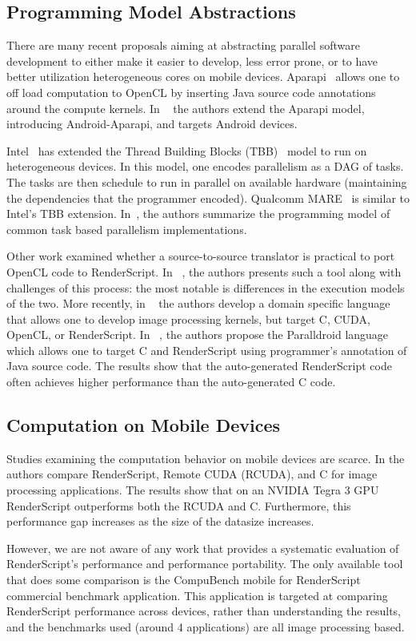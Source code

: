 \subsection{Programming Model Abstractions}


There are many recent proposals aiming at abstracting parallel software
development to either make it easier to develop, less error prone, or to have
better utilization heterogeneous cores on mobile devices.
Aparapi~\cite{Aparapi_web} allows one to off load computation to OpenCL by
inserting Java source code annotations around the compute kernels. In
~\cite{6704508} the authors extend the Aparapi model, introducing
Android-Aparapi, and targets Android devices.

Intel~\cite{barik2014efficient} has extended the Thread Building Blocks
(TBB)~\cite{reinders2007intel} model to run on heterogeneous devices. In this
model, one encodes parallelism as a DAG of tasks.  The tasks are then schedule
to run in parallel on available hardware (maintaining the dependencies that the
programmer encoded).  Qualcomm MARE~\cite{MARE_qc} is similar to Intel's TBB
extension.  In~\cite{khaldi2013task}, the authors summarize the programming
model of common task based parallelism implementations.

Other work examined whether a source-to-source translator is practical to port
OpenCL code to RenderScript.  In ~\cite{yang2012o2render}, the authors presents
such a tool along with challenges of this process: the most notable is
differences in the execution models of the two.  More recently, in
~\cite{6800300} the authors develop a domain specific language that allows one
to develop image processing kernels, but target C, CUDA, OpenCL, or
RenderScript. In ~\cite{alejandro2014performance}, the authors propose the
Paralldroid language which allows one to target C and RenderScript using
programmer's annotation of Java source code. The results show that the
auto-generated RenderScript code often achieves higher performance than the
auto-generated C code. 

\subsection{Computation on Mobile Devices}

Studies examining the computation behavior on mobile devices are scarce.  In
\cite{kemp2013using} the authors compare RenderScript, Remote CUDA (RCUDA), and
C for image processing applications. The results show that on an NVIDIA Tegra 3
GPU RenderScript outperforms both the RCUDA and C. Furthermore, this performance
gap increases as the size of the datasize increases.

However, we are not aware of any work that provides a systematic evaluation of
RenderScript's performance and performance portability.  The only available tool
that does some comparison is the CompuBench mobile for
RenderScript~\cite{compuBenchMobile} commercial benchmark application.  This
application is targeted at comparing RenderScript performance across devices,
rather than understanding the results, and the benchmarks used (around 4
applications) are all image processing based.


